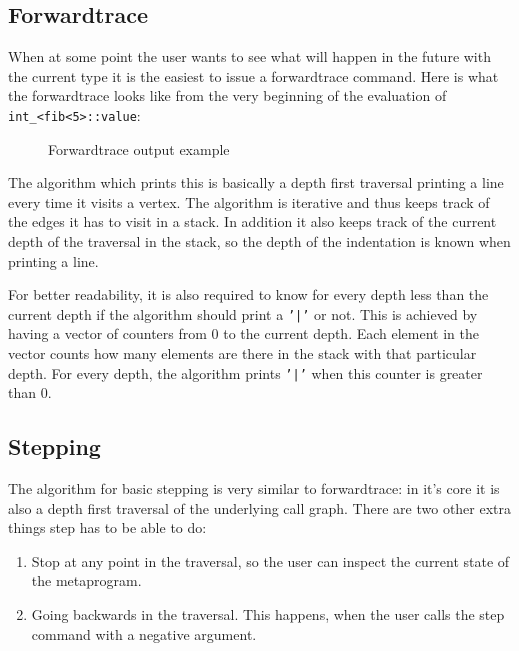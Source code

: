 \subsection{Forwardtrace}

When at some point the user wants to see what will happen in the future with
the current type it is the easiest to issue a forwardtrace command. Here is
what the forwardtrace looks like from the very beginning of the evaluation of
\texttt{int\_<fib<5>::value}:

\bigskip

\begin{figure}[H]
    
    \caption{Forwardtrace output example}
\end{figure}

\noindent
The algorithm which prints this is basically a depth first traversal printing
a line every time it visits a vertex. The algorithm is iterative and thus keeps
track of the edges it has to visit in a stack. In addition it also keeps track
of the current depth of the traversal in the stack, so the depth of the
indentation is known when printing a line.

For better readability, it is also required to know for every depth less than
the current depth if the algorithm should print a \texttt{'|'} or not. This
is achieved by having a vector of counters from 0 to the current depth. Each
element in the vector counts how many elements are there in the stack with that
particular depth. For every depth, the algorithm prints \texttt{'|'} when
this counter is greater than 0.

\subsection{Stepping}

The algorithm for basic stepping is very similar to forwardtrace: in it's core
it is also a depth first traversal of the underlying call graph. There are two
other extra things step has to be able to do:

\begin{enumerate}
    \item
        Stop at any point in the traversal, so the user can inspect the current
        state of the metaprogram.
    \item
        Going backwards in the traversal. This happens, when the user calls the
        step command with a negative argument.
\end{enumerate}

